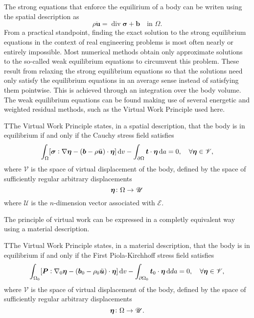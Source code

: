 The strong equations that enforce the equilirium of a body can be writen using the spatial description as
\begin{equation}
  \rho \ddot{\bm u} = \operatorname{div}\bm \sigma + \bm b\quad \text{in $\Omega.$}
\end{equation}
From a practical standpoint, finding the exact solution to the strong equilibrium equations in the context of real engineering problems is most often nearly or entirely impossible.
Most numerical methods obtain only approximate solutions to the so-called weak equilibrium equations to circumvent this problem.
These result from relaxing the strong equilibrium equations so that the solutions need only satisfy the equilibrium equations in an average sense instead of satisfying them pointwise.
This is achieved through an integration over the body volume.
The weak equilibrium equations can be found making use of several energetic and weighted residual methods, such as the Virtual Work Principle used here.
\enlargethispage{\baselineskip}
\begin{problem}
TThe Virtual Work Principle states, in a spatial description, that the body is in equilibrium if and only if the Cauchy stress field satisfies
    \begin{equation}
        \int_\Omega [\bm{\sigma}:\nabla \bm{\eta} - (\bm{b} -\rho \ddot{\bm u})\cdot \bm{\eta}]\,\mathrm{d} v - \int_{\partial\Omega} \bm{t}\cdot \bm{\eta}\,\mathrm{d} a = 0,\quad \forall \bm{\eta} \in \mathscr{V},
    \end{equation}
 where $\mathscr{V}$ is the space of virtual displacement of the body, defined by the space of sufficiently regular arbitrary displacements
 \begin{equation}
     \bm{\eta}\colon \Omega\to  \mathscr{U}
 \end{equation}
 where $\mathscr{U}$ is the $n$-dimension vector associated with $\mathscr{E}$.
 \end{problem}


The principle of virtual work can be expressed in a completly equivalent way using a material description.
\begin{problem}
TThe Virtual Work Principle states, in a material description, that the body is in equilibrium if and only if the First Piola-Kirchhoff stress field satisfies
    \begin{equation}
        \int_{\Omega_0} [\bm{P}:\nabla_0 \bm{\eta} - (\bm{b}_0 - \rho_0 \ddot{\bm u})\cdot \bm{\eta}]\,\mathrm{d} v - \int_{\partial\Omega_0} \bm{t}_0\cdot \bm{\eta}\,\mathrm{d} da = 0,\quad \forall \bm{\eta} \in \mathscr{V},
    \end{equation}
 where $\mathscr{V}$ is the space of virtual displacement of the body, defined by the space of sufficiently regular arbitrary displacements
 \begin{equation}
     \bm{\eta}\colon \Omega\to \mathscr{U}.
 \end{equation}
\end{problem}


